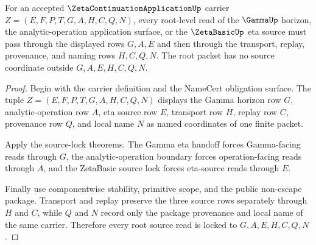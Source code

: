 \begin{theorem}
\label{thm:zeta-continuation-application-root-source-lock}
For an accepted $\ZetaContinuationApplicationUp$ carrier $Z=(E,F,P,T,G,A,H,C,Q,N)$, every root-level read of the $\GammaUp$ horizon, the analytic-operation application surface, or the $\ZetaBasicUp$ eta source must pass through the displayed rows $G,A,E$ and then through the transport, replay, provenance, and naming rows $H,C,Q,N$. The root packet has no source coordinate outside $G,A,E,H,C,Q,N$.
\end{theorem}
\begin{proof}
Begin with the carrier definition and the NameCert obligation surface. The tuple $Z=(E,F,P,T,G,A,H,C,Q,N)$ displays the Gamma horizon row $G$, analytic-operation row $A$, eta source row $E$, transport row $H$, replay row $C$, provenance row $Q$, and local name $N$ as named coordinates of one finite packet.

Apply the source-lock theorems. The Gamma eta handoff forces Gamma-facing reads through $G$, the analytic-operation boundary forces operation-facing reads through $A$, and the ZetaBasic source lock forces eta-source reads through $E$.

Finally use componentwise stability, primitive scope, and the public non-escape package. Transport and replay preserve the three source rows separately through $H$ and $C$, while $Q$ and $N$ record only the package provenance and local name of the same carrier. Therefore every root source read is locked to $G,A,E,H,C,Q,N$.
\end{proof}

